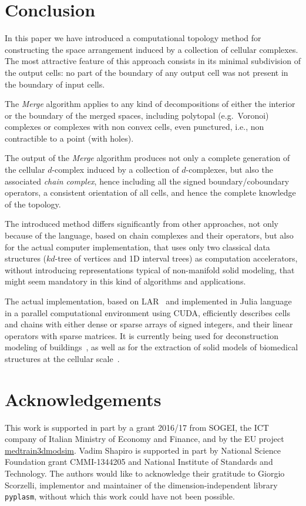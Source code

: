 \section{Conclusion}\label{conclusion}

In this paper we have introduced a computational topology method for constructing the space arrangement induced by a collection of cellular complexes. The most attractive feature of this approach consists in its minimal {subdivision} of the output cells:  no part of the boundary of any output cell  was not present in the boundary of input cells. 

The \emph{Merge} algorithm applies to any kind of  decompositions of either the interior or the boundary of the merged spaces, including polytopal (e.g.~Voronoi) complexes or complexes with non convex cells, even punctured, i.e., non contractible to a point {(with holes)}. 

The output of the \emph{Merge} algorithm produces not only a complete generation of the cellular $d$-complex induced by a collection of $d$-complexes, but also the associated \emph{chain complex}, hence including all the signed boundary/coboundary operators, a consistent orientation of all cells, and hence the complete knowledge of the topology. 

The introduced method differs significantly from other approaches, not only because of the language, based on chain complexes and their operators, but also for the actual computer implementation, that uses only two classical data structures ($kd$-tree of vertices and 1D interval trees) as computation accelerators, without introducing %
representations typical of non-manifold solid modeling, that  might seem mandatory in this kind of algorithms and applications. 

The actual implementation, based on LAR~\cite{Dicarlo:2014:TNL:2543138.2543294} and  {implemented} in Julia language~\cite{BEKS14} in a parallel computational environment using CUDA, efficiently describes cells and chains with either dense or sparse arrays of signed integers, and their linear operators with sparse matrices. It is currently being used for deconstruction modeling of buildings~\cite{visigrapp17:cvdlab}, as well as for the extraction of solid models of biomedical structures at the cellular scale~\cite{doi:10.1080/16864360.2016.1168216,ClementiSSPP-CAD16}.



\section*{Acknowledgements}
This work is supported in part by a grant 2016/17 from SOGEI, the ICT company of Italian Ministry of Economy and Finance, and by the  EU project \href{https://www.medtrain3dmodsim.eu}{medtrain3dmodsim}. {Vadim Shapiro is supported in part by National Science Foundation grant CMMI-1344205 and National Institute of Standards and Technology. }{The authors would like to acknowledge their gratitude to Giorgio Scorzelli, implementor and maintainer of the dimension-independent library \texttt{pyplasm}, without which this work could have not been possible. }



